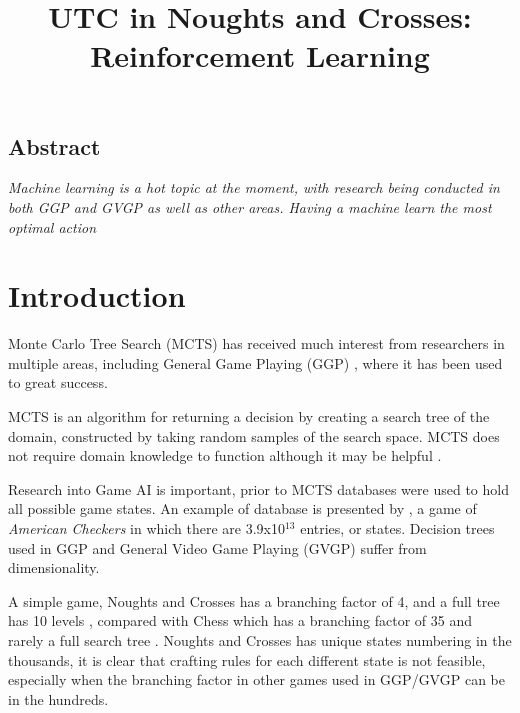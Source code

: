 \documentclass[conference]{IEEEtran}
\begin{document}
\date{}

\title{\Large\bf UTC in Noughts and Crosses: Reinforcement Learning}

\author{
}
 
\maketitle
\thispagestyle{empty}

\subsection*{\centering Abstract}
{\em
Machine learning is a hot topic at the moment, with research being conducted in both GGP and GVGP as well as other areas. Having a machine learn the most optimal action  
}

\section{Introduction}
Monte Carlo Tree Search (MCTS) has received much interest from researchers in multiple areas, including General Game Playing (GGP) \cite{sironi},  where it has been used to great success.

MCTS is an algorithm for returning a decision by creating a search tree of the domain, constructed by taking random samples of the search space. MCTS does not require domain knowledge to function although it may be helpful \cite{sironi}.

Research into Game AI is important, prior to MCTS databases were used to hold all possible game states. An example of database is presented by \cite{evomcts}, a game of {\em American Checkers} in which there are 3.9x10$^{13}$ entries, or states. Decision trees used in GGP and General Video Game Playing (GVGP) suffer from dimensionality. 

A simple game, Noughts and Crosses has a branching factor of 4, and a full tree has 10 levels \cite{bartle}, compared with Chess which has a branching factor of 35 and rarely a full search tree \cite{bartle}. Noughts and Crosses has unique states numbering in the thousands, it is clear that crafting rules for each different state is not feasible, especially when the branching factor in other games used in GGP/GVGP can be in the hundreds. 
\end{document}
